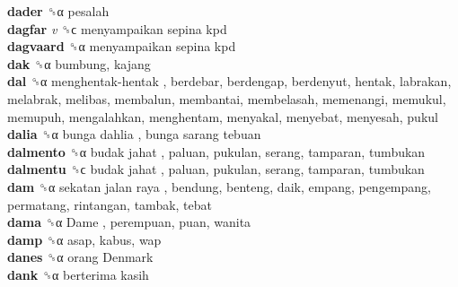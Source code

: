 \textbf{dader} ␝α  pesalah  \\
\textbf{dagfar} \emph{v}  ␝ϲ   menyampaikan sepina kpd   \\
\textbf{dagvaard} ␝α   menyampaikan sepina kpd   \\
\textbf{dak} ␝α  bumbung, kajang  \\
\textbf{dal} ␝α   menghentak-hentak , berdebar, berdengap, berdenyut, hentak, labrakan, melabrak, melibas, membalun, membantai, membelasah, memenangi, memukul, memupuh, mengalahkan, menghentam, menyakal, menyebat, menyesah, pukul  \\
\textbf{dalia} ␝α   bunga dahlia ,  bunga sarang tebuan   \\
\textbf{dalmento} ␝α   budak jahat , paluan, pukulan, serang, tamparan, tumbukan  \\
\textbf{dalmentu} ␝ϲ   budak jahat , paluan, pukulan, serang, tamparan, tumbukan  \\
\textbf{dam} ␝α   sekatan jalan raya , bendung, benteng, daik, empang, pengempang, permatang, rintangan, tambak, tebat  \\
\textbf{dama} ␝α   Dame , perempuan, puan, wanita  \\
\textbf{damp} ␝α  asap, kabus, wap  \\
\textbf{danes} ␝α   orang Denmark   \\
\textbf{dank} ␝α   berterima kasih   \\
